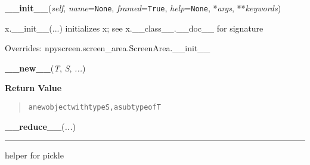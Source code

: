     \vspace{0.5ex}

    \begin{boxedminipage}{\textwidth}

    \raggedright \textbf{\_\_init\_\_}(\textit{self}, \textit{name}=\texttt{None}, \textit{framed}=\texttt{True}, \textit{help}=\texttt{None}, *\textit{args}, **\textit{keywords})

    x.\_\_init\_\_(...) initializes x; see x.\_\_class\_\_.\_\_doc\_\_ for 
    signature

    \vspace{1ex}

      Overrides: npyscreen.screen\_area.ScreenArea.\_\_init\_\_

    \end{boxedminipage}

    \label{object:__new__}

    \vspace{0.5ex}

    \begin{boxedminipage}{\textwidth}

    \raggedright \textbf{\_\_new\_\_}(\textit{T}, \textit{S}, \textit{...})

      \textbf{Return Value}
      \begin{quote}
\begin{alltt}
a new object with type S, a subtype of T
\end{alltt}

      \end{quote}

    \vspace{1ex}

    \end{boxedminipage}

    \label{object:__reduce__}

    \vspace{0.5ex}

    \begin{boxedminipage}{\textwidth}

    \raggedright \textbf{\_\_reduce\_\_}(\textit{...})

    \vspace{-1.5ex}

    \rule{\textwidth}{0.5\fboxrule}
    helper for pickle

    \vspace{1ex}

    \end{boxedminipage}

